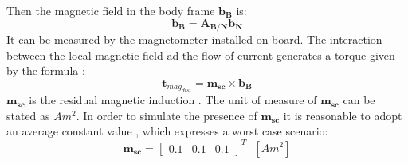 \documentclass[11pt]{article}
\begin{document}
Then the magnetic field in the body frame $\mathbf{b_B} $ is:
\begin{equation}
\mathbf{b_B}=\mathbf{A_{B/N}}\mathbf{b_N}
\end{equation}
 It can be measured by the magnetometer installed on board.
The interaction between the local magnetic field ad the flow of current generates a torque given by the formula :
\begin{equation}
\mathbf{t}_{mag_{dist}}=\mathbf{m_{sc}} \times \mathbf{b_B} 
\end{equation}
$ \mathbf{m_{sc}}$ is the residual  magnetic induction . The unit of measure of $ \mathbf{m_{sc}}$  can be stated as  $ Am^2$. In order to simulate the presence of $ \mathbf{m_{sc}}$ it is reasonable to adopt an average constant value , which expresses a worst case scenario:
\begin{equation}
\mathbf{m_{sc}} =\begin{bmatrix}

0.1&0.1&0.1
\end{bmatrix}^T \ \ \ [Am^2]
\end{equation}
\end{document}
